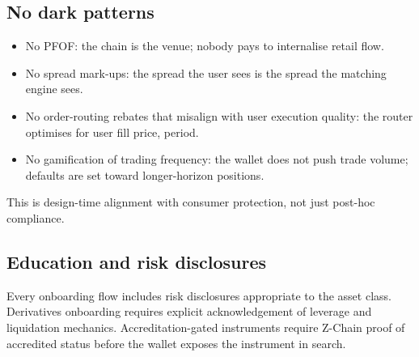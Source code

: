 \subsection{No dark patterns}

\begin{itemize}[leftmargin=1.2em]
  \item No PFOF: the chain is the venue; nobody pays to internalise
        retail flow.
  \item No spread mark-ups: the spread the user sees is the spread
        the matching engine sees.
  \item No order-routing rebates that misalign with user execution
        quality: the router optimises for user fill price, period.
  \item No gamification of trading frequency: the wallet does not
        push trade volume; defaults are set toward longer-horizon
        positions.
\end{itemize}

This is design-time alignment with consumer protection, not just
post-hoc compliance.

\subsection{Education and risk disclosures}

Every onboarding flow includes risk disclosures appropriate to the
asset class. Derivatives onboarding requires explicit acknowledgement
of leverage and liquidation mechanics. Accreditation-gated
instruments require Z-Chain \ZKP{} proof of accredited status before
the wallet exposes the instrument in search.
